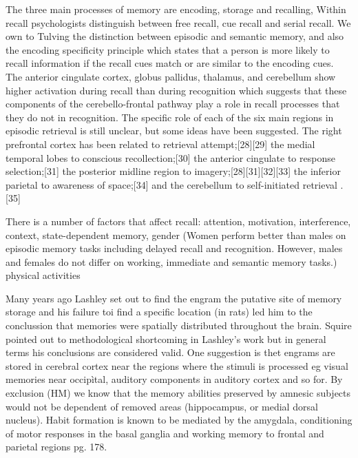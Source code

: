 \documentclass[11pt]{article}
\theoremstyle{definition}
\theoremstyle{remark}
\begin{document}
The three main processes of memory are encoding, storage and recalling, Within recall psychologists distinguish between free recall, cue recall and serial recall.
We own to Tulving the distinction between episodic and semantic memory, and also the encoding specificity principle which states that a person is more likely to recall information if the recall cues match or are similar to the encoding cues. 
The anterior cingulate cortex, globus pallidus, thalamus, and cerebellum show higher activation during recall than during recognition which suggests that these components of the cerebello-frontal pathway play a role in recall processes that they do not in recognition. The specific role of each of the six main regions in episodic retrieval is still unclear, but some ideas have been suggested. The right prefrontal cortex has been related to retrieval attempt;[28][29] the medial temporal lobes to conscious recollection;[30] the anterior cingulate to response selection;[31] the posterior midline region to imagery;[28][31][32][33] the inferior parietal to awareness of space;[34] and the cerebellum to self-initiated retrieval .[35]

There is a number of factors that affect recall: attention, motivation, interference, context, state-dependent memory, gender (Women perform better than males on episodic memory tasks including delayed recall and recognition. However, males and females do not differ on working, immediate and semantic memory tasks.) physical activities





Many years ago Lashley \cite{lashley1929brain} set out to find the engram the putative site of memory storage and his failure toi find a specific location (in rats) led him to the conclussion that memories were spatially distributed  throughout the brain. Squire \cite{squire2004memory} pointed out to methodological shortcoming in Lashley's work but in general terms his conclusions are considered valid.
One suggestion is thet engrams are stored in cerebral cortex near the regions where the stimuli is processed eg visual memories near occipìtal, auditory components in auditory cortex and so for. 
By exclusion (HM) we know that the memory abilities preserved by amnesic subjects would not be dependent of removed areas (hippocampus, or medial dorsal nucleus). Habit formation is known to be mediated by the amygdala, conditioning of motor responses in the basal ganglia and working memory to frontal and parietal regions \cite{margolin1992cognitive} pg. 178. 
\end{document}
